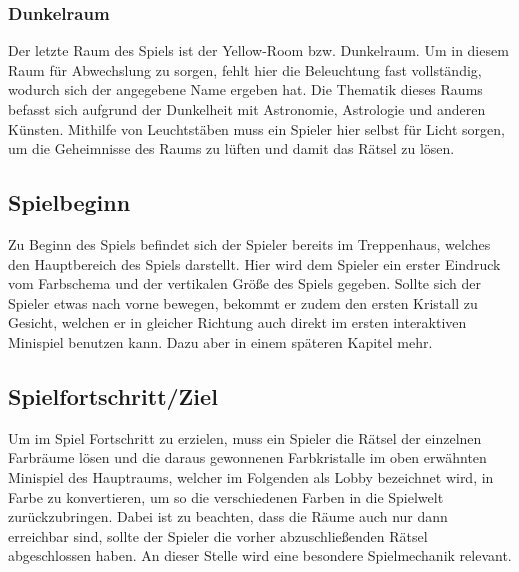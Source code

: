 \subsubsection{Dunkelraum}
Der letzte Raum des Spiels ist der Yellow-Room bzw. Dunkelraum. Um in diesem Raum für Abwechslung zu sorgen, fehlt hier die Beleuchtung fast vollständig, wodurch sich der angegebene Name ergeben hat. Die Thematik dieses Raums befasst sich aufgrund der Dunkelheit mit Astronomie, Astrologie und anderen Künsten. Mithilfe von Leuchtstäben muss ein Spieler hier selbst für Licht sorgen, um die Geheimnisse des Raums zu lüften und damit das Rätsel zu lösen.

\newpage
\noindent
\subsection{Spielbeginn}
Zu Beginn des Spiels befindet sich der Spieler bereits im Treppenhaus, welches den Hauptbereich des Spiels darstellt. Hier wird dem Spieler ein erster Eindruck vom Farbschema und der vertikalen Größe des Spiels gegeben. Sollte sich der Spieler etwas nach vorne bewegen, bekommt er zudem den ersten Kristall zu Gesicht, welchen er in gleicher Richtung auch direkt im ersten interaktiven Minispiel benutzen kann. Dazu aber in einem späteren Kapitel mehr.\\
\subsection{Spielfortschritt/Ziel}
Um im Spiel Fortschritt zu erzielen, muss ein Spieler die Rätsel der einzelnen Farbräume lösen und die daraus gewonnenen Farbkristalle im oben erwähnten Minispiel des Hauptraums, welcher im Folgenden als Lobby bezeichnet wird, in Farbe zu konvertieren, um so die verschiedenen Farben in die Spielwelt zurückzubringen.
Dabei ist zu beachten, dass die Räume auch nur dann erreichbar sind, sollte der Spieler die vorher abzuschließenden Rätsel abgeschlossen haben. An dieser Stelle wird eine besondere Spielmechanik relevant.
